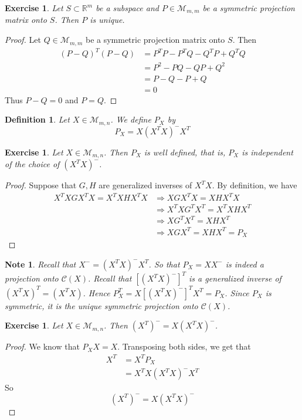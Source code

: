 \documentclass[12pt]{amsart}
\newtheorem{defn}[thm]{Definition}
\newtheorem{note}[thm]{Note}
\newtheorem{ex}[thm]{Exercise}
\newcommand{\R}{\mathbb{R}}
\newcommand{\MC}{\mathcal{C}}
\newcommand{\MM}{\mathcal{M}}
\newcommand{\z}[1]{Let ${#1} \in \MM_{m,n}$}
\begin{document}
\begin{ex}
Let $S \subset \R^m$ be a subspace and $P \in \MM_{m,m}$ be a symmetric projection matrix onto $S$. Then $P$ is unique. 
\end{ex}

\begin{proof}
Let $Q \in \MM_{m,m}$ be a symmetric projection matrix onto $S$. Then 
\begin{align*}
(P-Q)^T(P-Q) 
&= P^TP - P^TQ - Q^TP + Q^TQ \\
&= P^2 - PQ - QP +Q^2 \\
&= P - Q - P + Q \\
&= 0
\end{align*}
Thus $P-Q = 0$ and $P =Q$.
\end{proof}

\begin{defn}
\z{X}. We define $P_X$ by $$P_X = X (X^TX)^-X^T$$
\end{defn}

\begin{ex}
\z{X}. Then $P_X$ is well defined, that is, $P_X$ is independent of the choice of $(X^TX)^-$.
\end{ex}

\begin{proof}
Suppose that $G, H$ are generalized inverses of $X^TX$. By definition, we have 
\begin{align*}
X^TXGX^TX = X^TXHX^TX 
& \Rightarrow XGX^TX = XHX^TX \\
& \Rightarrow X^TXG^TX^T = X^TXHX^T \\
& \Rightarrow XG^TX^T = XHX^T \\
& \Rightarrow XGX^T = XHX^T = P_X
\end{align*}
\end{proof}

\begin{note}
Recall that $X^- = (X^TX)^-X^T$. So that $P_X = XX^-$ is indeed a projection onto $\MC(X)$. Recall that $[(X^TX)^-]^T$ is a generalized inverse of $(X^TX)^T = (X^TX)$. Hence $P_X^T = X[(X^TX)^-]^TX^T = P_X$. Since $P_X$ is symmetric, it is the unique symmetric projection onto $\MC(X)$. 
\end{note}

\begin{ex}
\z{X}. Then $(X^T)^- = X(X^TX)^-$. 
\end{ex}

\begin{proof}
We know that $P_X X = X$. Transposing both sides, we get that 
\begin{align*}
X^T 
&= X^TP_X \\
&= X^TX(X^TX)^-X^T
\end{align*} 
So $$(X^T)^- = X(X^TX)^-$$
\end{proof}
\end{document}

